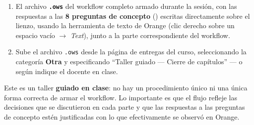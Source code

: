 \documentclass[11pt,letterpaper]{article}
\newcommand{\faPencil}{\raisebox{-0.1em}{\textbf{\Large\textbullet}}}
\begin{document}
\begin{enumerate}[leftmargin=1.2cm]
  \item El archivo \textbf{\texttt{.ows}} del workflow completo armado durante la sesión, con las respuestas a las \textbf{8 preguntas de concepto} (\faPencil) escritas directamente sobre el lienzo, usando la herramienta de texto de Orange (clic derecho sobre un espacio vacío $\to$ \textit{Text}), junto a la parte correspondiente del workflow.
  \item Sube el archivo \texttt{.ows} desde la página de entregas del curso, seleccionando la categoría \textbf{Otra} y especificando ``Taller guiado --- Cierre de capítulos'' --- o según indique el docente en clase.
\end{enumerate}

\begin{nota}
Este es un taller \textbf{guiado en clase}: no hay un procedimiento único ni una única forma correcta de armar el workflow. Lo importante es que el flujo refleje las decisiones que se discutieron en cada parte y que las respuestas a las preguntas de concepto estén justificadas con lo que efectivamente se observó en Orange.
\end{nota}
\end{document}
